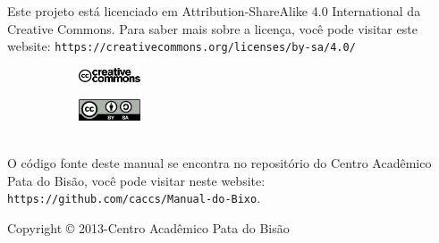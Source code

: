 \begin{center}
  Este projeto está licenciado em Attribution-ShareAlike 4.0 International da Creative Commons. Para saber mais sobre a licença, você pode visitar este website: \texttt{https://creativecommons.org/licenses/by-sa/4.0/}
~\\[\baselineskip]
  \begin{figure}[h]
    \centering
    \begin{subfigure}
      \centering
      \includegraphics[width=0.2\textwidth]{./imagem/cc_logo.pdf}
    \end{subfigure}
    \begin{subfigure}
      \centering
      \includegraphics[width=0.2\textwidth]{./imagem/by_sa.pdf}
    \end{subfigure}
  \end{figure}
~\\[\baselineskip]

  O código fonte deste manual se encontra no repositório do Centro Acadêmico Pata do Bisão, você pode visitar neste website: \texttt{https://github.com/caccs/Manual-do-Bixo}.


  \vfill Copyright © 2013-\the\year \thinspace Centro Acadêmico Pata do Bisão
\end{center}
